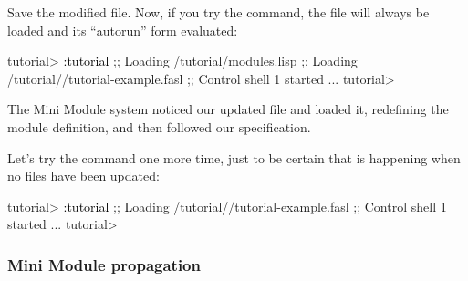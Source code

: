 \documentclass[10pt,twoside,english,pdftex]{article}
\begin{document}
Save the modified  file. Now, if you try the
 command, the  file will always be
loaded and its ``autorun'' form evaluated:
%
\W\supp
\begin{example}
\textcolor{darkergray}{%
  tutorial> \textcolor{black}{:tutorial}
  ;; Loading /tutorial/modules.lisp
  ;; Loading /tutorial//tutorial-example.fasl
  ;; Control shell 1 started
     ...
  tutorial>}
\end{example}
%
The Mini Module system noticed our updated  file and loaded
it, redefining the  module definition, and then followed our
 specification.

Let's try the  command one more time, just to be certain that
 is happening when no files have been updated:
%
\W\supp
\begin{example}
\textcolor{darkergray}{%
  tutorial> \textcolor{black}{:tutorial}
  ;; Loading /tutorial//tutorial-example.fasl
  ;; Control shell 1 started
     ...
  tutorial>}
\end{example}

\subsubsection*{Mini Module propagation}
\end{document}
